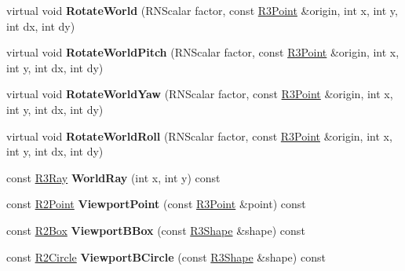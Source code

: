 \begin{DoxyCompactItemize}
\item 
virtual void {\bfseries Rotate\+World} (R\+N\+Scalar factor, const \hyperlink{class_r3_point}{R3\+Point} \&origin, int x, int y, int dx, int dy)\hypertarget{class_r3_viewer_a95c7c5fc4fb4e56db69269d4b73e5778}{}\label{class_r3_viewer_a95c7c5fc4fb4e56db69269d4b73e5778}

\item 
virtual void {\bfseries Rotate\+World\+Pitch} (R\+N\+Scalar factor, const \hyperlink{class_r3_point}{R3\+Point} \&origin, int x, int y, int dx, int dy)\hypertarget{class_r3_viewer_a9bbf6df378e6ad9d0be6d626365ff429}{}\label{class_r3_viewer_a9bbf6df378e6ad9d0be6d626365ff429}

\item 
virtual void {\bfseries Rotate\+World\+Yaw} (R\+N\+Scalar factor, const \hyperlink{class_r3_point}{R3\+Point} \&origin, int x, int y, int dx, int dy)\hypertarget{class_r3_viewer_a28e2145830aaf5639e2da021f3afa41f}{}\label{class_r3_viewer_a28e2145830aaf5639e2da021f3afa41f}

\item 
virtual void {\bfseries Rotate\+World\+Roll} (R\+N\+Scalar factor, const \hyperlink{class_r3_point}{R3\+Point} \&origin, int x, int y, int dx, int dy)\hypertarget{class_r3_viewer_a2dd19d90fc3939d4c80940c743558cfb}{}\label{class_r3_viewer_a2dd19d90fc3939d4c80940c743558cfb}

\item 
const \hyperlink{class_r3_ray}{R3\+Ray} {\bfseries World\+Ray} (int x, int y) const \hypertarget{class_r3_viewer_abb544cc2e61ea0508a975c6e29f0ce41}{}\label{class_r3_viewer_abb544cc2e61ea0508a975c6e29f0ce41}

\item 
const \hyperlink{class_r2_point}{R2\+Point} {\bfseries Viewport\+Point} (const \hyperlink{class_r3_point}{R3\+Point} \&point) const \hypertarget{class_r3_viewer_a369e74797bf0b9e973c45be2de2ef68f}{}\label{class_r3_viewer_a369e74797bf0b9e973c45be2de2ef68f}

\item 
const \hyperlink{class_r2_box}{R2\+Box} {\bfseries Viewport\+B\+Box} (const \hyperlink{class_r3_shape}{R3\+Shape} \&shape) const \hypertarget{class_r3_viewer_ad29bd51548bb59a54bfe8b0f28a981d0}{}\label{class_r3_viewer_ad29bd51548bb59a54bfe8b0f28a981d0}

\item 
const \hyperlink{class_r2_circle}{R2\+Circle} {\bfseries Viewport\+B\+Circle} (const \hyperlink{class_r3_shape}{R3\+Shape} \&shape) const \hypertarget{class_r3_viewer_a66752052269d8234e9171064a68be617}{}\label{class_r3_viewer_a66752052269d8234e9171064a68be617}


\end{DoxyCompactItemize}
